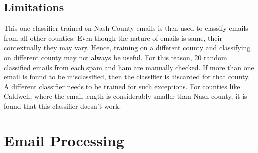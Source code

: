 \documentclass[fleqn]{MJDArticle}
\begin{document}
\subsection{Limitations}
This one classifier trained on Nash County emails is then used to classify emails from all other counties. Even though the nature of emails is same, their contextually they may vary. Hence, training on a different county and classifying on different county may not always be useful. For this reason, 20 random classified emails from each spam and ham are manually checked. If more than one email is found to be misclassified, then the classifier is discarded for that county. A different classifier needs to be trained for such exceptions.  For counties like Caldwell, where the email length is considerably smaller than Nash county, it is found that this classifier doesn't work.

\section{Email Processing}

 
\end{document}
